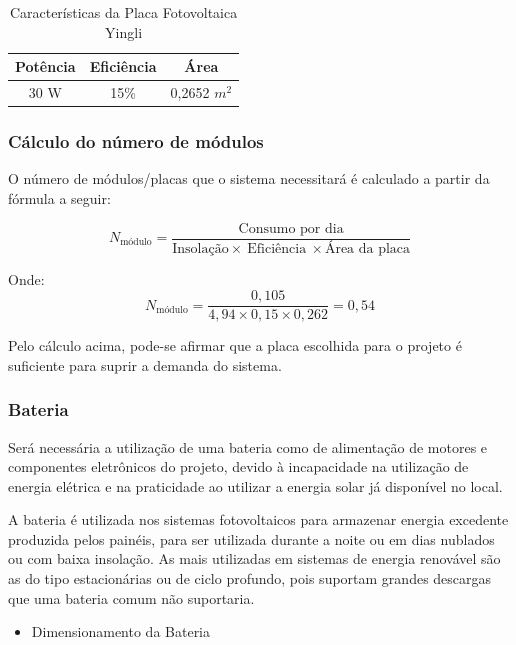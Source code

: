 \begin{table}[!ht]
\centering
\caption{Características da Placa Fotovoltaica Yingli}
\label{my-label}
\begin{tabular}{|c|c|c|}
\hline
\textbf{Potência} & \textbf{Eficiência} & \textbf{Área} \\ \hline
30 W & 15\% & 0,2652 $m^{2}$ \\ \hline
\end{tabular}
\end{table}

\subsubsection*{Cálculo do número de módulos}
O número de módulos/placas que o sistema necessitará é calculado a partir da fórmula a seguir:


\begin{equation}
N_{\text{módulo}}= \frac{\text{Consumo por dia}}{\text{Insolação}\times~\text{Eficiência}~\times\text{Área da placa}}
\end{equation}

Onde:
\begin{equation}
N_{\text{módulo}}= \frac{0,105}{4,94\times0,15\times0,262} = 0,54
\end{equation}

Pelo cálculo acima, pode-se afirmar que a placa escolhida para o projeto é suficiente para suprir a demanda do sistema.

\subsubsection{Bateria}

Será necessária a utilização de uma bateria como de alimentação de motores e componentes eletrônicos do projeto, devido à incapacidade na utilização de energia elétrica e na praticidade ao utilizar a energia solar já disponível no local.

A bateria é utilizada nos sistemas fotovoltaicos para armazenar energia excedente produzida pelos painéis, para ser utilizada durante a noite ou em dias nublados ou com baixa insolação. As mais utilizadas em sistemas de energia renovável são as do tipo estacionárias ou de ciclo profundo, pois suportam grandes descargas que uma bateria comum não suportaria.


\begin{itemize}
\item{Dimensionamento da Bateria}
\end{itemize}

